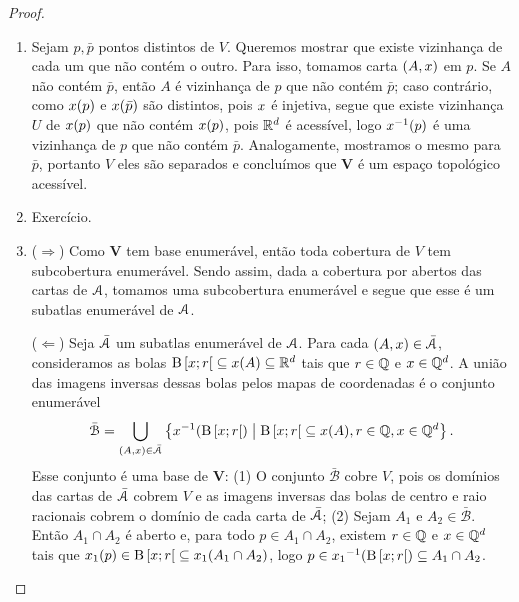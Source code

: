 \begin{proof}
	\begin{enumerate}
	\item Sejam $p,\bar p$ pontos distintos de $V$. Queremos mostrar que existe vizinhança de cada um que não contém o outro. Para isso, tomamos carta $(A,x)$ em $p$. Se $A$ não contém $\bar p$, então $A$ é vizinhança de $p$ que não contém $\bar p$; caso contrário, como $x(p)$ e $x(\bar p)$ são distintos, pois $x$ é injetiva, segue que existe vizinhança $U$ de $x(p)$ que não contém $x(p)$, pois $\mathbb{R}^d$ é acessível, logo $x^{-1}(p)$ é uma vizinhança de $p$ que não contém $\bar p$. Analogamente, mostramos o mesmo para $\bar p$, portanto $V$ eles são separados e concluímos que $\bm V$ é um espaço topológico acessível.

	\item Exercício.

	\item ($\Rightarrow$) Como $\bm V$ tem base enumerável, então toda cobertura de $V$ tem subcobertura enumerável. Sendo assim, dada a cobertura por abertos das cartas de $\mathcal{A}$, tomamos uma subcobertura enumerável e segue que esse é um subatlas enumerável de $\mathcal{A}$.

($\Leftarrow$) Seja $\bar {\mathcal{A}}$ um subatlas enumerável de $\mathcal{A}$. Para cada $(A,x) \in \bar {\mathcal{A}}$, consideramos as bolas $\mathrm{B}\left[{x};{r}\right[ \subseteq x(A) \subseteq \mathbb{R}^d$ tais que $r \in \mathbb{Q}$ e $x \in \mathbb{Q}^d$. A união das imagens inversas dessas bolas pelos mapas de coordenadas é o conjunto enumerável
	\begin{equation*}
	\bar{\mathcal B} = \bigcup_{(A,x) \in \bar {\mathcal{A}}} \left\{{x^{-1}(\mathrm{B}\left[{x};{r}\right[)}\;\middle\vert\;{\mathrm{B}\left[{x};{r}\right[ \subseteq x(A),  r \in \mathbb{Q}, x \in \mathbb{Q}^d}\right\}.
	\end{equation*}
Esse conjunto é uma base de $\bm V$: (1) O conjunto $\bar{\mathcal B}$ cobre $V$, pois os domínios das cartas de $\bar{\mathcal{A}}$ cobrem $V$ e as imagens inversas das bolas de centro e raio racionais cobrem o domínio de cada carta de $\bar{\mathcal{A}}$; (2) Sejam $A_1$ e $A_2 \in \bar{\mathcal B}$. Então $A_1 \cap A_2$ é aberto e, para todo $p \in A_1 \cap A_2$, existem $r \in \mathbb{Q}$ e $x \in \mathbb{Q}^d$ tais que $x_1(p) \in \mathrm{B}\left[{x};{r}\right[ \subseteq x_1(A_1 \cap A_2)$, logo $p \in {x_1}^{-1}(\mathrm{B}\left[{x};{r}\right[) \subseteq A_1 \cap A_2$.


\end{enumerate}
\end{proof}
